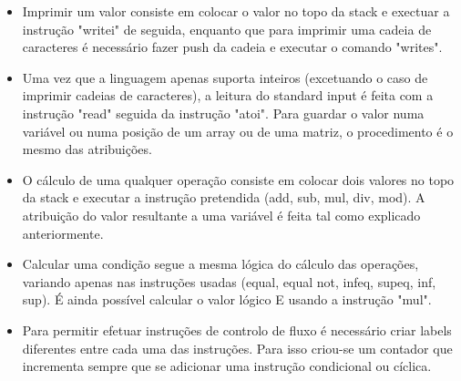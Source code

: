 \documentclass{report}
\begin{document}
\begin{itemize}
\begin{multicols}{2}
\begin{itemize}
\item \textbf{ARRAY}
\item pushgp
\item pushi P
\item padd
\item pushi I
\item loadn
\end{itemize}
\columnbreak
\begin{itemize}
\item \textbf{MATRIZ}
\item pushgp
\item pushi P
\item padd
\item pushi I
\item push T
\item mul
\item push J
\item loadn
\end{itemize}
\end{multicols}
\item Imprimir um valor consiste em colocar o valor no topo da stack e exectuar a instrução "writei" de seguida, enquanto que para imprimir uma cadeia de caracteres é necessário fazer push da cadeia e executar o comando "writes".
\item Uma vez que a linguagem apenas suporta inteiros (excetuando o caso de imprimir cadeias de caracteres), a leitura do standard input é feita com a instrução "read" seguida da instrução "atoi". Para guardar o valor numa variável ou numa posição de um array ou de uma matriz, o procedimento é o mesmo das atribuições.
\item O cálculo de uma qualquer operação consiste em colocar dois valores no topo da stack e executar a instrução pretendida (add, sub, mul, div, mod). A atribuição do valor resultante a uma variável é feita tal como explicado anteriormente.
\item Calcular uma condição segue a mesma lógica do cálculo das operações, variando apenas nas instruções usadas (equal, equal not, infeq, supeq, inf, sup). É ainda possível calcular o valor lógico E usando a instrução "mul".
\item Para permitir efetuar instruções de controlo de fluxo é necessário criar labels diferentes entre cada uma das instruções. Para isso criou-se um contador que incrementa sempre que se adicionar uma instrução condicional ou cíclica.

\end{itemize}
\end{document}
